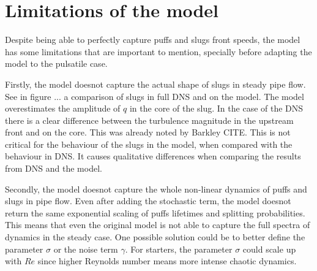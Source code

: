 \documentclass{article}
\begin{document}
\section{Limitations of the model}
Despite being able to perfectly capture puffs and slugs front speeds, the model has some limitations that are important to mention, specially before adapting the model to the pulsatile case.

Firstly, the model doesnot capture the actual shape of slugs in steady pipe flow. See in figure ... a comparison of slugs in full DNS and on the model. The model overestimates the amplitude of $q$ in the core of the slug. In the case of the DNS there is a clear difference between the turbulence magnitude in the upstream front and on the core. This was already noted by Barkley CITE. This is not critical for the behaviour of the slugs in the model, when compared with the behaviour in DNS. It causes qualitative differences when comparing the results from DNS and the model. 

Secondly, the model doesnot capture the whole non-linear dynamics of puffs and slugs in pipe flow. Even after adding the stochastic term, the model doesnot return the same exponential scaling of puffs lifetimes and splitting probabilities. This means that even the original model is not able to capture the full spectra of dynamics in the steady case. One possible solution could be to better define the parameter $\sigma$ or the noise term $\gamma$. For starters, the parameter $\sigma$ could scale up with $Re$ since higher Reynolds number means more intense chaotic dynamics.









\end{document}
